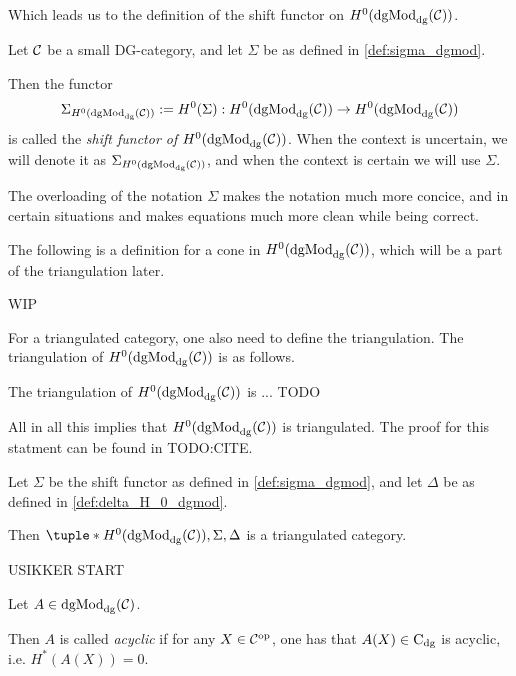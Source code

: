 Which leads us to the definition of the shift functor on \( H^0(\operatorname{dgMod}_{\operatorname{dg}}({\mathcal{C}})) \).

\begin{definition}
    \label{def:sigma_h_0_dgmod}
    Let \( {\mathcal{C}} \) be a small DG-category, and let \( \Sigma \) be as defined in \autoref{def:sigma_dgmod}.

    Then the functor
    \[
        \Sigma_{H^0(\operatorname{dgMod}_{\operatorname{dg}}({\mathcal{C}}))} := H^0(\Sigma): H^0(\operatorname{dgMod}_{\operatorname{dg}}({\mathcal{C}})) \to H^0(\operatorname{dgMod}_{\operatorname{dg}}({\mathcal{C}}))
    \]
    is called the \emph{shift functor of \( H^0(\operatorname{dgMod}_{\operatorname{dg}}({\mathcal{C}})) \)}. When the context is uncertain, we will denote it as \( \Sigma_{H^0(\operatorname{dgMod}_{\operatorname{dg}}({\mathcal{C}}))} \), and when the context is certain we will use \( \Sigma \).
\end{definition}

The overloading of the notation \( \Sigma \) makes the notation much more concice, and in certain situations and makes equations much more clean while being correct.

The following is a definition for a cone in \( H^0(\operatorname{dgMod}_{\operatorname{dg}}({\mathcal{C}})) \), which will be a part of the triangulation later.

\begin{definition}
    WIP
\end{definition}

For a triangulated category, one also need to define the triangulation. The triangulation of \( H^0(\operatorname{dgMod}_{\operatorname{dg}}({\mathcal{C}})) \) is as follows.
\begin{definition}
    \label{def:delta_H_0_dgmod}
    The triangulation of \( H^0(\operatorname{dgMod}_{\operatorname{dg}}({\mathcal{C}})) \) is ... TODO
\end{definition}

All in all this implies that \( H^0(\operatorname{dgMod}_{\operatorname{dg}}({\mathcal{C}})) \) is triangulated. The proof for this statment can be found in TODO:CITE.
\begin{theorem}
    Let \( \Sigma \) be the shift functor as defined in \autoref{def:sigma_dgmod}, and let \( \Delta \) be as defined in \autoref{def:delta_H_0_dgmod}.

    Then \( \tuple*{H^0(\dgMod_{\dg}(\Cc)), \Sigma, \Delta} \) is a triangulated category.
\end{theorem}

USIKKER START

\begin{definition}
    Let \( A \in \operatorname{dgMod}_{\operatorname{dg}}({\mathcal{C}}) \).

    Then \( A \) is called \emph{acyclic} if for any \( X \in {\mathcal{C}}^{\operatorname{op}} \), one has that \( A(X) \in \operatorname{C}_{\operatorname{dg}} \) is acyclic, i.e. \( H^*(A(X)) = 0 \).
\end{definition}


